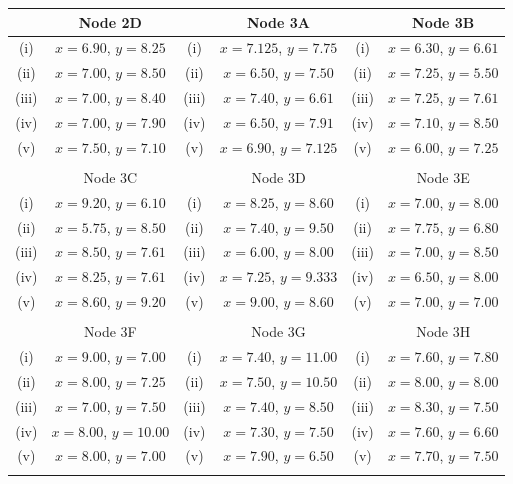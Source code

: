 \documentclass[12pt]{article}
\begin{document}
		\begin{tabular}{||c|c||c|c||c|c||}
			
			
			\hline  & Node 2D &   & Node 3A &  & Node 3B   \\  \hline
			\hline (i) & $x=6.90$, $y=8.25$ &  (i) & $x=7.125$, $y = 7.75$  & (i)  & $x=6.30$, $y=6.61$\\  \hline
			\hline (ii)  & $x=7.00$, $y=8.50$  &  (ii) & $x=6.50$, $y = 7.50$ & (ii) & $x=7.25$, $y =5.50$ \\  \hline
			\hline (iii) & $x=7.00$, $y = 8.40$  & (iii) & $x=7.40$, $y = 6.61 $ &(iii) & $x=7.25$, $y=7.61$ \\  \hline
			\hline (iv)  & $x=7.00$, $y=7.90$  & (iv) & $x=6.50$, $y = 7.91$ & (iv)  & $x=7.10$, $y=8.50$\\  \hline
			\hline (v) & $x=7.50$, $y = 7.10$ & (v) & $x=6.90$, $y = 7.125 $  &(v) & $x=6.00$, $y=7.25$\\  \hline & & & & & \\
			\hline 
			\hline  & Node 3C &   & Node 3D &  & Node 3E  \\  \hline
			\hline (i) & $x=9.20$, $y =6.10$ &  (i) & $x=8.25$, $y = 8.60$  & (i)  & $x=7.00$, $y = 8.00$\\  \hline
			\hline (ii) & $x=5.75$, $y=8.50$  & (ii) & $x= 7.40$, $y = 9.50 $ &(ii) & $x=7.75$, $y =6.80$ \\  \hline
			\hline (iii)  & $x=8.50$, $y= 7.61$  & (iii) & $x=6.00$, $y =8.00$ & (iii)  & $x=7.00$, $y = 8.50$\\  \hline
			\hline (iv)  & $x=8.25$, $y = 7.61$  &  (iv) & $x=7.25$, $y =9.333$ & (iv) & $x=6.50$, $y = 8.00$ \\  \hline
			\hline (v) & $x=8.60$, $y=9.20$ & (v) & $x=9.00 $, $y = 8.60$  &(v) & $x=7.00$, $y =7.00$\\  \hline & & & & & \\
			\hline 
			\hline  &  Node 3F &  & Node 3G &   & Node 3H \\  \hline
			\hline (i) & $x=9.00$, $y = 7.00$ & (i) & $x=7.40$, $y = 11.00$  & (i)  & $x=7.60$, $y = 7.80$\\  \hline
			\hline (ii)  & $x=8.00$, $y =7.25 $  & (ii) & $x=7.50 $, $y=10.50$ & (ii) & $x=8.00$, $y = 8.00$ \\  \hline
			\hline (iii) & $x=7.00$, $y = 7.50 $   & (iii) & $x=7.40$, $y=8.50$ &(iii) & $x=8.30$, $y = 7.50$ \\  \hline
			\hline (iv)  & $x=8.00$, $y = 10.00$  & (iv) & $x=7.30$, $y=7.50$ & (iv)  & $x=7.60 $, $y = 6.60$\\  \hline
			\hline (v) & $x=8.00$, $y = 7.00$ & (v)  & $x=7.90$, $y =6.50 $ & (v) & $x=7.70$, $y = 7.50$\\  \hline
			\hline 
			& & & & & \\ \hline

				\end{tabular} 
			
\end{document}
